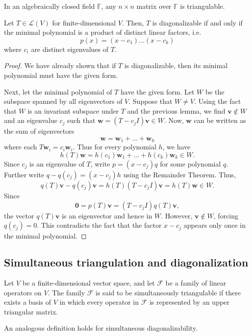 \documentclass[11pt]{article}
\newcommand{\F}{\mathbb{F}}
\renewcommand{\vec}[1]{\boldsymbol{#1}}
\newcommand{\vv}{\vec{v}}
\newcommand{\vw}{\vec{w}}
\newcommand{\alg}[1]{\mathscr{#1}}
\newcommand{\algF}{\alg{F}}
\theoremstyle{definition}
\theoremstyle{remark}
\numberwithin{equation}{section}
\begin{document}
    \begin{corollary}
        In an algebraically closed field $\F$, any $n\times n$ matrix over $\F$ is
        triangulable.
    \end{corollary}

    \begin{theorem}
        Let $T \in \alg{L}(V)$ for finite-dimensional $V$. Then, $T$ is diagonalizable
        if and only if the minimal polynomial is a product of distinct linear
        factors, i.e.\ \[
            p(x) = (x - c_1) \dots (x - c_k)
        \] where $c_i$ are distinct eigenvalues of $T$.
    \end{theorem}
    \begin{proof}
        We have already shown that if $T$ is diagonalizable, then its minimal
        polynomial must have the given form.

        Next, let the minimal polynomial of $T$ have the given form. Let $W$ be the
        subspace spanned by all eigenvectors of $V$. Suppose that $W \neq V$. Using
        the fact that $W$ is an invariant subspace under $T$ and the previous lemma,
        we find $\vv \notin W$ and an eigenvalue $c_j$ such that $\vw = (T - c_jI)\vv
        \in W$. Now, $\vw$ can be written as the sum of eigenvectors \[
            \vw = \vw_1 + \dots + \vw_k
        \] where each $T\vw_i = c_i\vw_i$. Thus for every polynomial $h$, we have \[
            h(T)\vw = h(c_1)\vw_1 + \dots + h(c_k)\vw_k \in W.
        \] Since $c_j$ is an eigenvalue of $T$, write $p = (x - c_j)q$ for some
        polynomial $q$. Further write $q - q(c_j) = (x - c_j)h$ using the Remainder
        Theorem. Thus, \[
            q(T)\vv - q(c_j)\vv = h(T)(T - c_jI)\vv = h(T)\vw \in W.
        \] Since \[
            \vec{0} = p(T)\vv = (T - c_jI)q(T)\vv,
        \] the vector $q(T)\vv$ is an eigenvector and hence in $W$. However, $\vv
        \notin W$, forcing $q(c_j) = 0$. This contradicts the fact that the factor
        $x - c_j$ appears only once in the minimal polynomial.
    \end{proof}


    \subsection{Simultaneous triangulation and diagonalization}

    \begin{definition}
        Let $V$ be a finite-dimensional vector space, and let $\algF$ be a
        family of linear operators on $V$. The family $\algF$ is said to be
        simultaneously triangulable if there exists a basis of $V$ in which every
        operator in $\algF$ is represented by an upper triangular matrix.

        An analogous definition holds for simultaneous diagonalizability.
    \end{definition}
\end{document}
